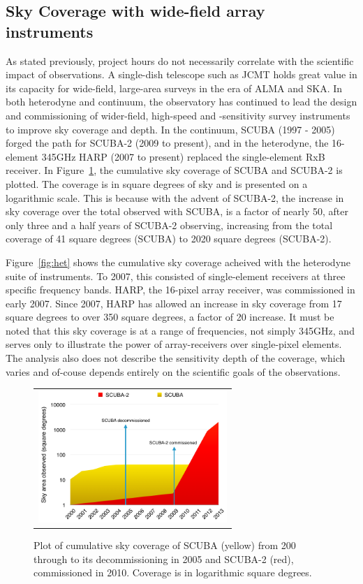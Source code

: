 \documentclass[]{spie}  %
\begin{document}
\subsection{Sky Coverage with wide-field array instruments}

As stated previously, project hours do not necessarily correlate with
the scientific impact of observations. A single-dish telescope such as
JCMT holds great value in its capacity for wide-field, large-area
surveys in the era of ALMA and SKA. In both heterodyne and continuum,
the observatory has continued to lead the design and commissioning of
wider-field, high-speed and -sensitivity survey instruments to improve
sky coverage and depth. In the continuum, SCUBA (1997 - 2005) forged
the path for SCUBA-2 (2009 to present), and in the heterodyne, the
16-element 345GHz HARP (2007 to present) replaced the single-element
RxB receiver. In Figure~\ref{fig:sc2}, the cumulative sky coverage of
SCUBA and SCUBA-2 is plotted. The coverage is in square degrees of sky
and is presented on a logarithmic scale. This is because with the
advent of SCUBA-2, the increase in sky coverage over the total
observed with SCUBA, is a factor of nearly 50, after only three and a
half years of SCUBA-2 observing, increasing from the total coverage of
41 square degrees (SCUBA) to 2020 square degrees (SCUBA-2).

Figure~\ref{fig:het} shows the cumulative sky coverage acheived with
the heterodyne suite of instruments. To 2007, this consisted of
single-element receivers at three specific frequency bands. HARP, the
16-pixel array receiver, was commissioned in early 2007. Since 2007,
HARP has allowed an increase in sky coverage from 17 square degrees to
over 350 square degrees, a factor of 20 increase. It must be noted
that this sky coverage is at a range of frequencies, not simply
345GHz, and serves only to illustrate the power of array-receivers
over single-pixel elements. The analysis also does not describe the
sensitivity depth of the coverage, which varies and of-couse depends
entirely on the scientific goals of the observations.

\begin{figure}[h]
   \begin{center}
   \begin{tabular}{c}
   \includegraphics[height=5cm]{scuba2scuba_areacover.png}
   \end{tabular}
   \end{center}
   \caption{\label{fig:sc2} Plot of cumulative sky coverage of SCUBA (yellow) from 200 through to its decommissioning in 2005 and SCUBA-2 (red), commissioned in 2010. Coverage is in logarithmic square degrees.}
\end{figure}
\end{document}
